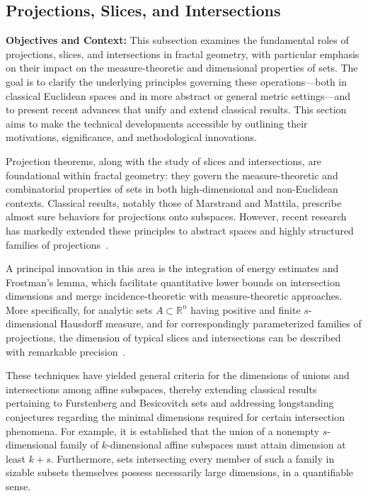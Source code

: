 \documentclass[sigconf]{acmart}
\begin{document}
\subsection{Projections, Slices, and Intersections}

\textbf{Objectives and Context:} This subsection examines the fundamental roles of projections, slices, and intersections in fractal geometry, with particular emphasis on their impact on the measure-theoretic and dimensional properties of sets. The goal is to clarify the underlying principles governing these operations—both in classical Euclidean spaces and in more abstract or general metric settings—and to present recent advances that unify and extend classical results. This section aims to make the technical developments accessible by outlining their motivations, significance, and methodological innovations.

Projection theorems, along with the study of slices and intersections, are foundational within fractal geometry: they govern the measure-theoretic and combinatorial properties of sets in both high-dimensional and non-Euclidean contexts. Classical results, notably those of Marstrand and Mattila, prescribe almost sure behaviors for projections onto subspaces. However, recent research has markedly extended these principles to abstract spaces and highly structured families of projections~\cite{ref1, ref6, ref21, ref23, ref30, ref43, ref74, ref75, ref92}.

A principal innovation in this area is the integration of energy estimates and Frostman's lemma, which facilitate quantitative lower bounds on intersection dimensions and merge incidence-theoretic with measure-theoretic approaches. More specifically, for analytic sets $A\subset\mathbb{R}^n$ having positive and finite $s$-dimensional Hausdorff measure, and for correspondingly parameterized families of projections, the dimension of typical slices and intersections can be described with remarkable precision~\cite{ref74}. 

These techniques have yielded general criteria for the dimensions of unions and intersections among affine subspaces, thereby extending classical results pertaining to Furstenberg and Besicovitch sets and addressing longstanding conjectures regarding the minimal dimensions required for certain intersection phenomena. For example, it is established that the union of a nonempty $s$-dimensional family of $k$-dimensional affine subspaces must attain dimension at least $k+s$. Furthermore, sets intersecting every member of such a family in sizable subsets themselves possess necessarily large dimensions, in a quantifiable sense.
\end{document}
